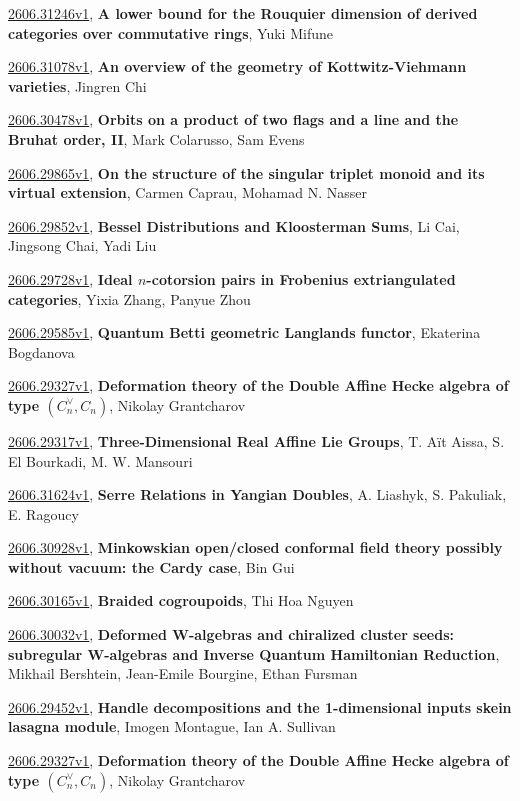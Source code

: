 \documentclass[9pt, a4paper]{article}
\theoremstyle{plain}
\theoremstyle{definition}
\theoremstyle{remark}
\newcommand{\arxiv}[3]{\href{https://arxiv.org/abs/#1}{#1}, \textbf{\textcolor{arxivblue}{#2}}, #3}
\begin{document}
\arxiv{2606.31246v1}{A lower bound for the Rouquier dimension of derived categories over commutative rings}{Yuki Mifune}

\arxiv{2606.31078v1}{An overview of the geometry of Kottwitz-Viehmann varieties}{Jingren Chi}

\arxiv{2606.30478v1}{Orbits on a product of two flags and a line and the Bruhat order, II}{Mark Colarusso, Sam Evens}

\arxiv{2606.29865v1}{On the structure of the singular triplet monoid and its virtual extension}{Carmen Caprau, Mohamad N. Nasser}

\arxiv{2606.29852v1}{Bessel Distributions and Kloosterman Sums}{Li Cai, Jingsong Chai, Yadi Liu}

\arxiv{2606.29728v1}{Ideal $n$-cotorsion pairs in Frobenius extriangulated categories}{Yixia Zhang, Panyue Zhou}

\arxiv{2606.29585v1}{Quantum Betti geometric Langlands functor}{Ekaterina Bogdanova}

\arxiv{2606.29327v1}{Deformation theory of the Double Affine Hecke algebra of type $(C_n^\vee,C_n)$}{Nikolay Grantcharov}

\arxiv{2606.29317v1}{Three-Dimensional Real Affine Lie Groups}{T. Aït Aissa, S. El Bourkadi, M. W. Mansouri}

\arxiv{2606.31624v1}{Serre Relations in Yangian Doubles}{A. Liashyk, S. Pakuliak, E. Ragoucy}

\arxiv{2606.30928v1}{Minkowskian open/closed conformal field theory possibly without vacuum: the Cardy case}{Bin Gui}

\arxiv{2606.30165v1}{Braided cogroupoids}{Thi Hoa Nguyen}

\arxiv{2606.30032v1}{Deformed W-algebras and chiralized cluster seeds: subregular W-algebras and Inverse Quantum Hamiltonian Reduction}{Mikhail Bershtein, Jean-Emile Bourgine, Ethan Fursman}

\arxiv{2606.29452v1}{Handle decompositions and the 1-dimensional inputs skein lasagna module}{Imogen Montague, Ian A. Sullivan}

\arxiv{2606.29327v1}{Deformation theory of the Double Affine Hecke algebra of type $(C_n^\vee,C_n)$}{Nikolay Grantcharov}

\end{document}
